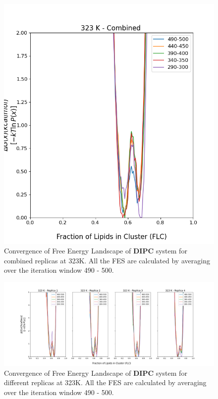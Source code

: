 \documentclass{biophys-new}
\begin{document}
\begin{figure}[hbt!]
\centering
\includegraphics[width=0.6\linewidth]{all_plots/ClusterLipids2Total/DPPC_DIPC_CHOL/323K/Convergence_DIPC_MULTI__323_ClusterLipids2Total.png}
\caption{Convergence of Free Energy Landscape of \textbf{DIPC} system for combined replicas at 323K. All the FES are calculated by averaging over the iteration window 490 - 500.}
\label{fig:view}

\end{figure}

\begin{figure}[hbt!]
\centering
\includegraphics[width=1.1\linewidth]{all_plots/ClusterLipids2Total/DPPC_DIPC_CHOL/323K/Convergence_DIPC_323_ClusterLipids2Total.png}
\caption{Convergence of Free Energy Landscape of \textbf{DIPC} system for different replicas at 323K. All the FES are calculated by averaging over the iteration window 490 - 500.}
\label{fig:view}

\end{figure}
\end{document}
